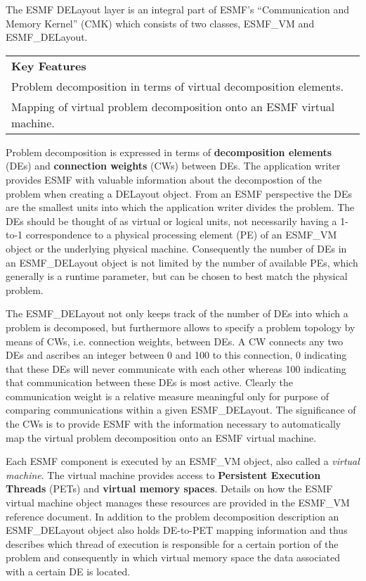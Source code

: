 
The ESMF DELayout layer is an integral part of ESMF's ``Communication and Memory Kernel'' (CMK) which consists of two classes, ESMF\_VM and ESMF\_DELayout.
\begin{center}  
\begin{tabular}{|p{6in}|}
\hline
\vspace{.01in}
{\bf Key Features} \\[.01in]
Problem decomposition in terms of virtual decomposition elements.\\
Mapping of virtual problem decomposition onto an ESMF virtual machine.\\[.03in] \hline
\end{tabular}
\end{center}

Problem decomposition is expressed in terms of {\bf decomposition elements} (DEs) and {\bf connection weights} (CWs) between DEs. The application writer provides ESMF with valuable information about the decompostion of the problem when creating a DELayout object. From an ESMF perspective the DEs are the smallest units into which the application writer divides the problem. The DEs should be thought of as virtual or logical units, not necessarily having a 1-to-1 correspondence to a physical processing element (PE) of an ESMF\_VM object or the underlying physical machine. Consequently the number of DEs in an ESMF\_DELayout object is not limited by the number of available PEs, which generally is a runtime parameter, but can be chosen to best match the physical problem.

The ESMF\_DELayout not only keeps track of the number of DEs into which a problem is decomposed, but furthermore allows to specify a problem topology by means of CWs, i.e. connection weights, between DEs. A CW connects any two DEs and ascribes an integer between 0 and 100 to this connection, 0 indicating that these DEs will never communicate with each other whereas 100 indicating that communication between these DEs is most active. Clearly the communication weight is a relative measure meaningful only for purpose of comparing communications within a given ESMF\_DELayout. The significance of the CWs is to provide ESMF with the information necessary to automatically map the virtual problem decomposition onto an ESMF virtual machine.

Each ESMF component is executed by an ESMF\_VM object, also called a {\em virtual machine}. The virtual machine provides access to {\bf Persistent Execution Threads} (PETs) and {\bf virtual memory spaces}. Details on how the ESMF virtual machine object manages these resources are provided in the ESMF\_VM reference document. In addition to the problem decomposition description an ESMF\_DELayout object also holds DE-to-PET mapping information and thus describes which thread of execution is responsible for a certain portion of the problem and consequently in which virtual memory space the data associated with a certain DE is located.

